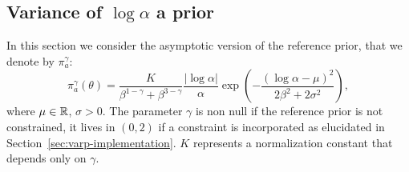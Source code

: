 \subsection{Variance of $\log\alpha$ a prior}
    \label{sec:var_prior_alpha}



In this section we consider the asymptotic version of the reference prior, that we denote by $\pi^{\gamma}_a$:
    \begin{equation}
        \pi^\gamma_a(\theta) = \frac{K}{\beta^{1-\gamma}+\beta^{3-\gamma}}\frac{|\log\alpha|}{\alpha}\exp\left(-\frac{(\log\alpha-\mu)^2}{2\beta^2+2\sigma^2}  \right), 
    \end{equation}
where $\mu\in\mathbb{R}$, $\sigma>0$. The parameter $\gamma$ is non null if the reference prior is not constrained, it lives  in $(0,2)$ if a constraint is incorporated as elucidated in Section~\ref{sec:varp-implementation}. $K$ represents a normalization constant that depends only on $\gamma$.

